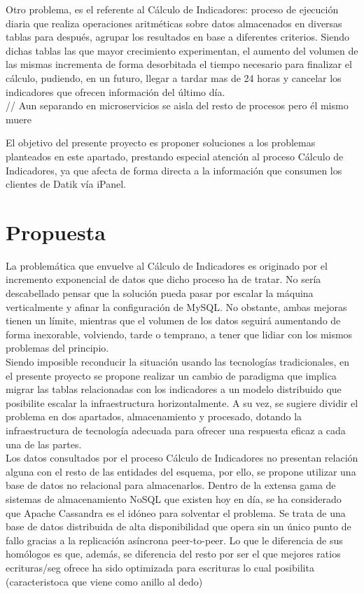 Otro problema, es el referente al Cálculo de Indicadores: proceso de ejecución diaria que realiza operaciones aritméticas sobre datos almacenados en diversas tablas para después, agrupar los resultados en base a diferentes criterios. Siendo dichas tablas las que mayor crecimiento experimentan, el aumento del volumen de las mismas incrementa de forma desorbitada el tiempo necesario para finalizar el cálculo, pudiendo, en un futuro, llegar a tardar mas de 24 horas y cancelar los indicadores que ofrecen información del último día.\\

// Aun separando en microservicios se aisla del resto de procesos pero él mismo muere

El objetivo del presente proyecto es proponer soluciones a los problemas planteados en este apartado, prestando especial atención al proceso Cálculo de Indicadores, ya que afecta de forma directa a la información que consumen los clientes de Datik vía iPanel.\\

\section{Propuesta}

La problemática que envuelve al Cálculo de Indicadores es originado por el incremento exponencial de datos que dicho proceso ha de tratar. No sería descabellado pensar que la solución pueda pasar por escalar la máquina verticalmente y afinar la configuración de MySQL. No obstante, ambas mejoras tienen un límite, mientras que el volumen de los datos seguirá aumentando de forma inexorable, volviendo, tarde o temprano, a tener que lidiar con los mismos problemas del principio.\\

Siendo imposible reconducir la situación usando las tecnologías tradicionales, en el presente proyecto se propone realizar un cambio de paradigma que implica migrar las tablas relacionadas con los indicadores a un modelo distribuido que posibilite escalar la infraestructura horizontalmente. A su vez, se sugiere dividir el problema en dos apartados, almacenamiento y procesado, dotando la infraestructura de tecnología adecuada para ofrecer una respuesta eficaz a cada una de las partes.\\

Los datos consultados por el proceso Cálculo de Indicadores no presentan relación alguna con el resto de las entidades del esquema, por ello, se propone utilizar una base de datos no relacional para almacenarlos. Dentro de la extensa gama de sistemas de almacenamiento NoSQL que existen hoy en día, se ha considerado que Apache Cassandra \cite{lakshman2010cassandra} es el idóneo para solventar el problema. Se trata de una base de datos distribuida de alta disponibilidad que opera sin un único punto de fallo gracias a la replicación asíncrona peer-to-peer. Lo que le diferencia de sus homólogos es que, además, se diferencia del resto por ser el que mejores ratios ecrituras/seg ofrece ha sido optimizada para  escrituras lo cual posibilita  (caracteristoca que viene como anillo al dedo)

